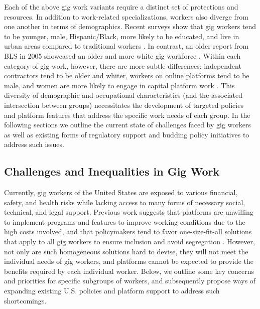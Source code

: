 Each of the above gig work variants require a distinct set of protections and resources. In addition to work-related specializations, workers also diverge from one another in terms of demographics. Recent surveys show that gig workers tend to be younger, male, Hispanic/Black, more likely to be educated, and live in urban areas compared to traditional workers \cite{noauthor_undated-tq,Gelles-Watnick2021-fz}. In contrast, an older report from BLS in 2005 showcased an older and more white gig workforce \cite{Howard2017-wd}. Within each category of gig work, however, there are more subtle differences: independent contractors tend to be older and whiter, workers on online platforms tend to be male, and women are more likely to engage in capital platform work \cite{Davidson2022-le}. This diversity of demographic and occupational characteristics (and the associated intersection between groups) necessitates the development of targeted policies and platform features that address the specific work needs of each group. In the following sections we outline the current state of challenges faced by gig workers as well as existing forms of regulatory support and budding policy initiatives to address such issues.

\subsection{Challenges and Inequalities in Gig Work}
Currently, gig workers of the United States are exposed to various financial, safety, and health risks while lacking access to many forms of necessary social, technical, and legal support. Previous work suggests that platforms are unwilling to implement programs and features to improve working conditions due to the high costs involved, and that policymakers tend to favor one-size-fit-all solutions that apply to all gig workers to ensure inclusion and avoid segregation \cite{codesign}. However, not only are such homogeneous solutions hard to devise, they will not meet the individual needs of gig workers, and platforms cannot be expected to provide the benefits required by each individual worker. Below, we outline some key concerns and priorities for specific subgroups of workers, and subsequently propose ways of expanding existing U.S. policies and platform support to address such shortcomings.

